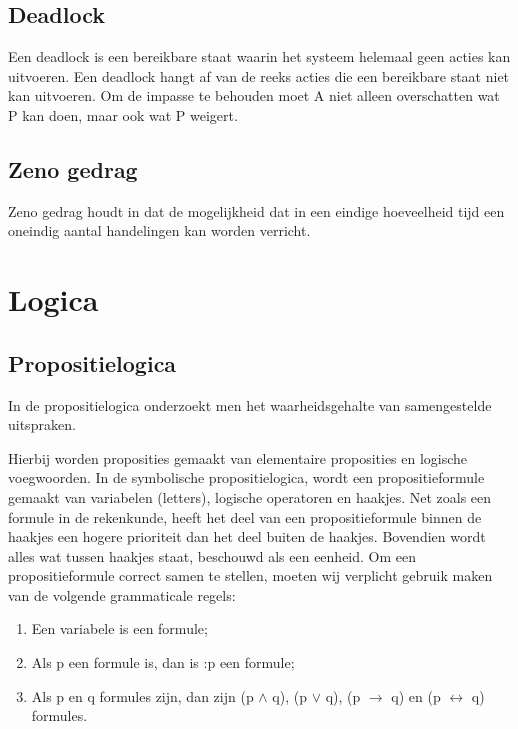 \documentclass{article}
\begin{document}
	\subsection{Deadlock}
	Een deadlock is een bereikbare staat waarin het systeem   helemaal geen acties kan uitvoeren. Een deadlock hangt af van de reeks acties die een bereikbare staat niet kan uitvoeren. Om de impasse te behouden moet A niet alleen overschatten wat P kan doen, maar ook wat P weigert.
	\subsection{Zeno gedrag}
	Zeno gedrag houdt in dat de mogelijkheid dat in een eindige hoeveelheid tijd een oneindig aantal handelingen kan worden verricht.
	
	
	\section{Logica}
	
	
	
	\subsection{Propositielogica}
	
	
	In de propositielogica onderzoekt men het waarheidsgehalte van samengestelde uitspraken.
	
	Hierbij worden proposities gemaakt van elementaire proposities en logische
	voegwoorden. In de symbolische propositielogica, wordt een
	propositieformule gemaakt van variabelen (letters), logische operatoren en haakjes. Net
	zoals een formule in de rekenkunde, heeft het deel van een propositieformule binnen de
	haakjes een hogere prioriteit dan het deel buiten de haakjes. Bovendien wordt alles wat
	tussen haakjes staat, beschouwd als een eenheid.
	 Om een propositieformule correct samen
	te stellen, moeten wij verplicht gebruik maken van de volgende grammaticale regels:
	\begin{enumerate}
		\item Een variabele is een formule;
		\item Als p een formule is, dan is :p een formule;
		\item Als p en q formules zijn, dan zijn (p $\wedge$ q), (p $\vee$ q), (p  $\rightarrow$ q) en (p $\leftrightarrow$ q) formules.
	\end{enumerate}
	
\end{document}
